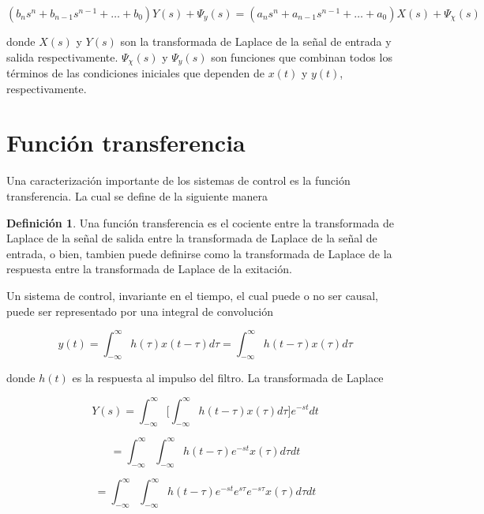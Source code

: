 \documentclass[12pt]{book}
\theoremstyle{definition}
\newtheorem{dfn}{Definición}[section]
\theoremstyle{remark}
\theoremstyle{plain}
\begin{document}
\begin{equation}
\label{equ303}
 (b_n s^n+b_{n-1} s^{n-1}+ \dotsc  + b_0) Y(s)+ \Psi _{y} (s)=(a_n s^n +a_{n-1} s^{n-1} + \dotsc + a_0)X(s)+ \Psi _{\chi} (s)
\end{equation}

donde
$X(s)$ y $Y(s)$ son la transformada de Laplace de la señal de entrada y salida respectivamente.
$ \Psi _{\chi} (s)$ y $\Psi _{y} (s)$ son funciones que combinan todos los términos de las  condiciones iniciales que dependen de $x(t)$ y $y(t)$, respectivamente.

\section{Función transferencia}
Una caracterización importante de los sistemas de control es la función transferencia. La cual se define de la siguiente manera

\begin{dfn}
\label{def302}
Una función transferencia es el cociente entre la transformada de Laplace de la señal de salida entre la transformada de Laplace de la señal de entrada, o bien, tambien puede definirse como la transformada de Laplace de la respuesta entre la transformada de Laplace de la exitación.
\end{dfn}

Un sistema de control, invariante en el tiempo, el cual puede o no ser causal, puede ser representado por una integral de convolución

\begin{equation}
\label{equ304}
 y(t)= \int_{- \infty}^{\infty} h(\tau) x(t- \tau)d \tau= \int_{- \infty}^{\infty} h(t - \tau) x( 
\tau) d \tau
\end{equation}

donde $h(t)$ es la respuesta al impulso del filtro. La transformada de Laplace 

\begin{equation*}
 Y(s)=  \int_{- \infty}^{\infty} \bigg [ \int_{- \infty}^{\infty} h(t - \tau) x(\tau)d \tau \bigg ]e^{-s t} d t
\end{equation*}

\begin{equation*}
 = \int_{- \infty}^{\infty}  \int_{- \infty}^{\infty} h(t- \tau) e^{-s t} x(\tau)   d \tau   d t
\end{equation*}

\begin{equation*}
 = \int_{- \infty}^{\infty}  \int_{- \infty}^{\infty} h(t- \tau) e^{-s t}  e^{s \tau} e^{-s \tau} x(\tau)   d \tau   d t
\end{equation*}
\end{document}

